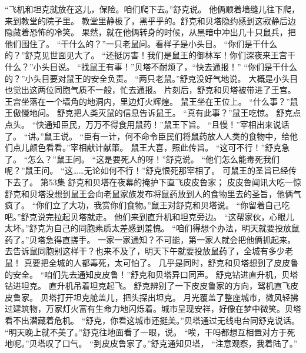 \documentclass[a4paper,12pt,UTF8,twoside]{ctexbook}
\begin{document}
        “飞机和坦克就放在这儿，保险。咱们爬下去。”舒克说。 
        他俩顺着墙缝儿往下爬，来到教堂的院子里。 
        教堂里静极了，黑乎乎的。舒克和贝塔隐约感到这寂静后边隐藏着恐怖的冷笑。 
        果然，就在他俩转身的时候，从黑暗中冲出几十只鼠兵，把他们围住了。 
        “干什么的？”一只老鼠问。看样子是小头目。 
        “你们是干什么的？”舒克见世面见大了。 
        “还挺厉害！我们是鼠王的御林军！你们深夜来王宫干什么？”小头目说。 
        “找鼠王有事！”贝塔不耐烦了，“快去通报！” 
        “你们是干什么的？”小头目要对鼠王的安全负责。 
        “两只老鼠。”舒克没好气地说。 
        大概是小头目也觉出这两位同胞气质不一般，忙去通报。 
        片刻后，舒克和贝塔被带进了王宫。 
        王宫坐落在一个墙角的地洞内，里边灯火辉煌。 
        鼠王坐在王位上。 
        “什么事？”鼠王傲慢地问。 
        舒克把人类灭鼠的信息告诉鼠王。 
        “真有此事？”鼠王吃惊。 
        舒克点点头。 
        “快通知臣民，万万不得食用鼠药！”鼠王下旨。 
        “且慢！”宰相出来说话了。 
        “讲。”鼠王说。 
        “臣有一计，何不命令臣民们将鼠药放人人类的食物中，给他们点儿颜色看看。”宰相献计献策。 
        鼠王大喜，照此传旨。 
        “这可不行！”舒克急了。 
        “怎么？”鼠王问。 
        “这是要死人的呀！”舒克说。 
        “他们怎么能毒死我们呢？”鼠王问。 
        “这……无论如何不行！”舒克恨死那宰相了。 
        可鼠王的圣旨已经传下去了。   第53集 
        舒克和贝塔在夜幕的掩护下直飞皮皮鲁家； 
        皮皮鲁闻讯大吃一惊   
        舒克和贝塔没想到鼠王会向老鼠家族发布将鼠药放到人的食物里去的圣旨，他俩气疯了。 
        “你们立了大功，我赏你们食物。”鼠王对舒克和贝塔说。 
        “你留着自己吃吧。”舒克说完拉起贝塔就走。 
        他们来到直升机和坦克旁边。 
        “这帮家伙，心眼儿太坏。”舒克为自己的同胞素质太差感到羞愧。 
        “咱们得想个办法，明天就要投放鼠药了。”贝塔急得直搓手。 
        一家一家通知？不可能，第一家人就会把他俩抓起来。去告诉鼠同胞别这样干？也来不及了，明天下午就要投放鼠药了，全城有多少老鼠！ 
        真要把全城的人都毒死，太可怕了。 
        几乎是同时，舒克和贝塔想到了皮皮鲁的安全。 
        “咱们先去通知皮皮鲁！”舒克和贝塔异口同声。 
        舒克钻进直升机，贝塔钻进坦克。 
        直升机吊着坦克起飞。 
        舒克辨别了一下皮皮鲁家的方向，驾机直飞皮皮鲁家。 
        贝塔打开坦克舱盖儿，把头探出坦克。 
        月光覆盖了整座城市，微风轻拂过建筑物，万家灯火富有生命力地闪烁着。城市呈现安祥，好像在梦中微笑。贝塔看不出潜藏着危机。 
        “舒克，你看这城市还挺美。”贝塔通过无线电台同舒克说话。 
        “明天晚上就不美了。”舒克往地面看了一眼，说。 
        “唉，干吗都想互相置对方于死地呢。”贝塔叹了口气。 
        “到皮皮鲁家了。”舒克通知贝塔，  “注意观察，我着陆了。” 
\end{document}
